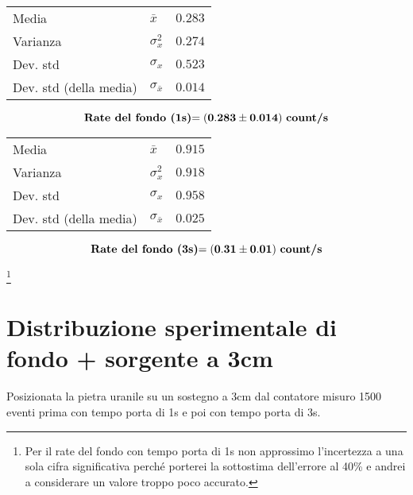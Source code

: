 \documentclass{article}
\begin{document}
\begin{minipage}[c]{0.45\textwidth}
\vspace{1cm}
\begin{center}
\hspace{0.5cm}
\begin{tabular}{llr}
	Media                       & $\bar{x}$             & $0.283$       \\		
	Varianza                    & $\sigma_{x}^2$          & $0.274$     \\
	Dev. std                    & $\sigma_{x}$              & $0.523$   \\
	Dev. std (della media)      & $\sigma_{\bar{x}}$    & $0.014$       \\
\end{tabular}
\end{center}

\[ 
	\text{\textbf{Rate del fondo (1s)}} \mathbf{ = \left(0.283 \pm 0.014\right)}\text{ \textbf{count/s}}
\]
\end{minipage}
\hfill
\begin{minipage}[c]{0.45\textwidth}
\vspace{1cm}
\begin{center}
\begin{tabular}{llr}
	Media                       & $\bar{x}$             & $0.915$       \\		
	Varianza                    & $\sigma_{x}^2$          & $0.918$     \\
	Dev. std                    & $\sigma_{x}$              & $0.958$   \\
	Dev. std (della media)      & $\sigma_{\bar{x}}$    & $0.025$       \\
\end{tabular}
\end{center}

\[ 
	\text{\textbf{Rate del fondo (3s)}}  \mathbf{ = \left(0.31 \pm 0.01 \right)} \text{ \textbf{count/s}}
\]
\end{minipage}
\footnote{Per il rate del fondo con tempo porta di 1s non approssimo l'incertezza a una sola cifra significativa perché porterei la sottostima dell'errore al 40\% e andrei a considerare un valore troppo poco accurato.}



\newpage
\section{Distribuzione sperimentale di fondo + sorgente a 3cm}
Posizionata la pietra uranile su un sostegno a 3cm dal contatore misuro 1500 eventi prima con tempo porta di 1s e poi con tempo porta di 3s. 
\end{document}
